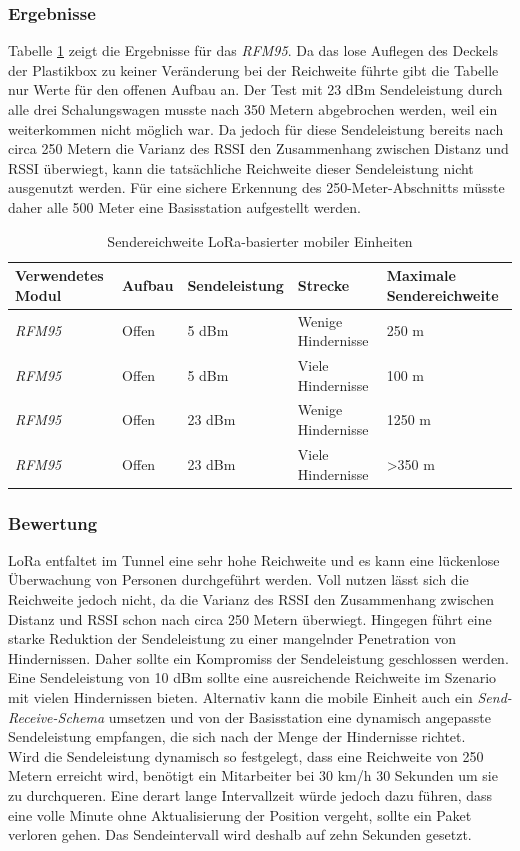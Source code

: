 \subsubsection{Ergebnisse}
Tabelle \ref{table:rangelora} zeigt die Ergebnisse für das \emph{RFM95}.
Da das lose Auflegen des Deckels der Plastikbox zu keiner Veränderung bei der Reichweite führte gibt die Tabelle nur Werte für den offenen Aufbau an. 
Der Test mit 23 dBm Sendeleistung durch alle drei Schalungswagen musste nach 350 Metern abgebrochen werden, weil ein weiterkommen nicht möglich war.
Da jedoch für diese Sendeleistung bereits nach circa 250 Metern die Varianz des RSSI den Zusammenhang zwischen Distanz und RSSI überwiegt, kann die tatsächliche Reichweite dieser Sendeleistung nicht ausgenutzt werden.
Für eine sichere Erkennung des 250-Meter-Abschnitts müsste daher alle 500 Meter eine Basisstation aufgestellt werden.

\begin{table}[h]
	\centering
	\caption{Sendereichweite LoRa-basierter mobiler Einheiten}
	\label{table:rangelora}
	\begin{tabular}{p{2.2cm}|p{1.5cm}|p{2.5cm}|p{3.5cm}|p{3cm}}
		Verwendetes Modul & Aufbau & Sendeleistung & Strecke & Maximale Sendereichweite \\
		\hline
		\emph{RFM95} & Offen & 5 dBm & Wenige Hindernisse & 250 m \\
		\emph{RFM95} & Offen & 5 dBm & Viele Hindernisse & 100 m \\
		\hline
		\emph{RFM95} & Offen & 23 dBm & Wenige Hindernisse & 1250 m \\
		\emph{RFM95} & Offen & 23 dBm & Viele Hindernisse & >350 m \\
	\end{tabular}
\end{table}

\subsubsection{Bewertung}
LoRa entfaltet im Tunnel eine sehr hohe Reichweite und es kann eine lückenlose Überwachung von Personen durchgeführt werden.
Voll nutzen lässt sich die Reichweite jedoch nicht, da die Varianz des RSSI den Zusammenhang zwischen Distanz und RSSI schon nach circa 250 Metern überwiegt. 
Hingegen führt eine starke Reduktion der Sendeleistung zu einer mangelnder Penetration von Hindernissen.
Daher sollte ein Kompromiss der Sendeleistung geschlossen werden. 
Eine Sendeleistung von 10 dBm sollte eine ausreichende Reichweite im Szenario mit vielen Hindernissen bieten.
Alternativ kann die mobile Einheit auch ein \emph{Send-Receive-Schema} umsetzen und von der Basisstation eine dynamisch angepasste Sendeleistung empfangen, die sich nach der Menge der Hindernisse richtet.\\
Wird die Sendeleistung dynamisch so festgelegt, dass eine Reichweite von 250 Metern erreicht wird, benötigt ein Mitarbeiter bei 30 km/h 30 Sekunden um sie zu durchqueren.
Eine derart lange Intervallzeit würde jedoch dazu führen, dass eine volle Minute ohne Aktualisierung der Position vergeht, sollte ein Paket verloren gehen.
Das Sendeintervall wird deshalb auf zehn Sekunden gesetzt.

